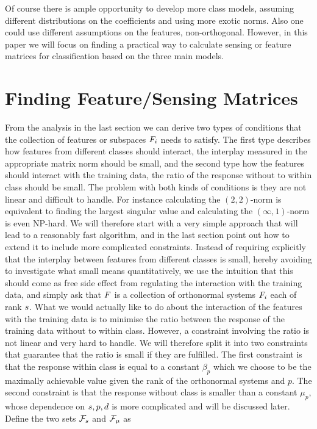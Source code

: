 \documentclass[11pt]{article}
\begin{document}
Of course there is ample opportunity to develop more class models, assuming different distributions on the coefficients and using more exotic norms. Also one could use different assumptions on the features, \ie non-orthogonal. However, in this paper we will focus on finding a practical way to calculate sensing or feature matrices for classification based on the three main models.

\section{Finding Feature/Sensing Matrices \label{sec:find_sensing}}
From the analysis in the last section we can derive two types of conditions that the collection of features or subspaces ${F}_i$ needs to satisfy. The first type describes how features from different classes should interact, \ie the interplay measured in the appropriate matrix norm should be small, and the second type how the features should interact with the training data, \ie the ratio of the response without to within class should be small. The problem with both kinds of conditions is they are not linear and difficult to handle. For instance calculating the $(2,2)$-norm is equivalent to finding the largest singular value and calculating the $(\infty,1)$-norm is even NP-hard. We will therefore start with a very simple approach that will lead to a reasonably fast algorithm, and in the last section point out how to extend it to include more complicated constraints.
Instead of requiring explicitly that the interplay between features from different classes is small, hereby avoiding to investigate what small means quantitatively, we use the intuition that this should come as free side effect from regulating the interaction with the training data, and simply ask that ${F}$ is a collection of orthonormal systems ${F}_i$ each of rank ${s}$. What we would actually like to do about the interaction of the features with the training data is to minimise the ratio between the response of the training data without to within class. However, a constraint involving the ratio is not linear and very hard to handle. We will therefore split it into two constraints that guarantee that the ratio is small if they are fulfilled. The first constraint is that the response within class is equal to a constant $\beta_p$ which we choose to be the maximally achievable value given the rank of the orthonormal systems and $p$. The second constraint is that the response without class is smaller than a constant $\mu_p$, whose dependence on ${s}, p, {d}$ is more complicated and will be discussed later. Define the two sets $\mathcal{{F}}_{{s}}$ and $\mathcal{{F}}_\mu$ as
\end{document}
